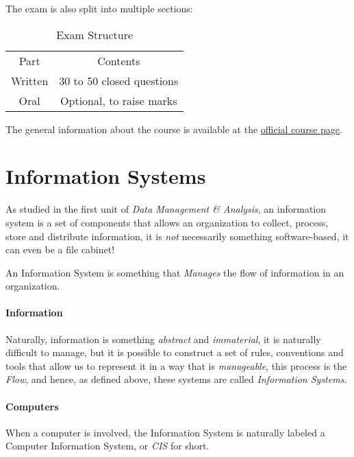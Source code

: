 \documentclass[openright, twoside, twocolumn, a4paper, 10pt]{report}
\begin{document}
The exam is also split into multiple sections:

\begin{table}[h!]
	\centering
	\begin{tabular}{c c}
		\rowcolor{gray!50}
		Part    & Contents                  \\
		Written & 30 to 50 closed questions \\
		Oral    & Optional, to raise marks  \\
	\end{tabular}
	\caption{Exam Structure}\label{tab:label}
\end{table}

The general information about the course is available at the \href{http://wwwusers.di.uniroma1.it/~cilli/}{official course page}.


\section{Information Systems}

As studied in the first unit of \emph{Data Management \& Analysis}, an information system is a set of components that allows an organization
to collect, process, store and distribute information, it is \emph{not} necessarily something software-based, it can even be
a file cabinet!

\begin{definition}\label{def:is}
	An Information System is something that \emph{Manages} the flow of information in an organization.
\end{definition}

\paragraph{Information}
Naturally, information is something \emph{abstract} and \emph{immaterial}, it is naturally difficult to manage, but it is possible
to construct a set of rules, conventions and tools that allow us to represent it in a way that is \emph{manageable}, this process
is the \emph{Flow}, and hence, as defined above, these systems are called \emph{Information Systems}.

\paragraph{Computers}
When a computer is involved, the Information System is naturally labeled a Computer Information System, or \emph{CIS} for short.
\end{document}
